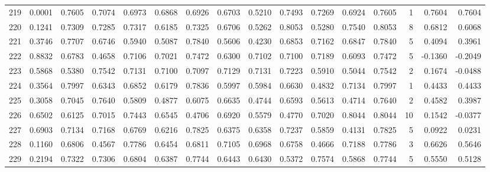 \begin{tabular}{lrrrrrrrrrrrrrrr}
219 &      0.0001 &  0.7605 &  0.7074 &  0.6973 &  0.6868 &  0.6926 &  0.6703 &  0.5210 &  0.7493 &  0.7269 &   0.6924 &     0.7605 &      1 &                    0.7604 &                     0.7604 \\
220 &      0.1241 &  0.7309 &  0.7285 &  0.7317 &  0.6185 &  0.7325 &  0.6706 &  0.5262 &  0.8053 &  0.5280 &   0.7540 &     0.8053 &      8 &                    0.6812 &                     0.6068 \\
221 &      0.3746 &  0.7707 &  0.6746 &  0.5940 &  0.5087 &  0.7840 &  0.5606 &  0.4230 &  0.6853 &  0.7162 &   0.6847 &     0.7840 &      5 &                    0.4094 &                     0.3961 \\
222 &      0.8832 &  0.6783 &  0.4658 &  0.7106 &  0.7021 &  0.7472 &  0.6300 &  0.7102 &  0.7100 &  0.7189 &   0.6093 &     0.7472 &      5 &                   -0.1360 &                    -0.2049 \\
223 &      0.5868 &  0.5380 &  0.7542 &  0.7131 &  0.7100 &  0.7097 &  0.7129 &  0.7131 &  0.7223 &  0.5910 &   0.5044 &     0.7542 &      2 &                    0.1674 &                    -0.0488 \\
224 &      0.3564 &  0.7997 &  0.6343 &  0.6852 &  0.6179 &  0.7836 &  0.5997 &  0.5984 &  0.6630 &  0.4832 &   0.7134 &     0.7997 &      1 &                    0.4433 &                     0.4433 \\
225 &      0.3058 &  0.7045 &  0.7640 &  0.5809 &  0.4877 &  0.6075 &  0.6635 &  0.4744 &  0.6593 &  0.5613 &   0.4714 &     0.7640 &      2 &                    0.4582 &                     0.3987 \\
226 &      0.6502 &  0.6125 &  0.7015 &  0.7443 &  0.6545 &  0.4706 &  0.6920 &  0.5579 &  0.4770 &  0.7020 &   0.8044 &     0.8044 &     10 &                    0.1542 &                    -0.0377 \\
227 &      0.6903 &  0.7134 &  0.7168 &  0.6769 &  0.6216 &  0.7825 &  0.6375 &  0.6358 &  0.7237 &  0.5859 &   0.4131 &     0.7825 &      5 &                    0.0922 &                     0.0231 \\
228 &      0.1160 &  0.6806 &  0.4567 &  0.7786 &  0.6454 &  0.6811 &  0.7105 &  0.6968 &  0.6758 &  0.4666 &   0.7188 &     0.7786 &      3 &                    0.6626 &                     0.5646 \\
229 &      0.2194 &  0.7322 &  0.7306 &  0.6804 &  0.6387 &  0.7744 &  0.6443 &  0.6430 &  0.5372 &  0.7574 &   0.5868 &     0.7744 &      5 &                    0.5550 &                     0.5128 \\

\end{tabular}
